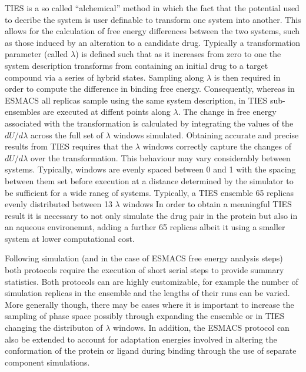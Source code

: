 TIES is a so called ``alchemical'' method in which the fact that the potential used to decribe the system is user definable to transform one 
system into another.
This allows for the calculation of free energy differences between the two 
systems, such as those induced by an alteration to a candidate drug.
Typically a transformation parameter (called $\lambda$) is defined such that as it increases from zero to one the system description transforms from containing an 
initial drug to a target compound via a series of hybrid states.
Sampling along $\lambda$ is then required in order to compute the difference in binding free energy.
Consequently, whereas in ESMACS all replicas sample using the same system description, 
in TIES sub-ensembles are executed at diffent points along $\lambda$.
The change in free energy associated with the transformation is calculated by integrating the 
values of the $dU/d\lambda$ across the full set of $\lambda$ windows simulated.
Obtaining accurate and precise results from TIES requires that the $\lambda$ windows correctly 
capture the changes of $dU/d\lambda$ over the transformation.
This behaviour may vary considerably between systems.
Typically, windows are evenly spaced between 0 and 1 with the spacing between them set before 
execution at a distance determined by the simulator to be sufficient for a wide raneg of systems. 
Typically, a TIES ensemble 65 replicas evenly distributed between 13 $\lambda$ windows
In order to obtain a meaningful TIES result it is necessary to not only simulate the drug pair 
in the protein but also in an aqueous environemnt, adding a further 65 replicas albeit it using a
smaller system at lower computational cost.

Following simulation (and in the case of ESMACS free energy analysis steps) both protocols require
the execution of short serial steps to provide summary statistics.
Both protocols can are highly customizable, for example the number of simulation replicas in the 
ensemble and the lengths of their runs can be varied.
More generally though, there may be cases where it is important to increase the sampling of phase 
space possibly through expanding the ensemble or in TIES changing the distributon of $\lambda$ 
windows.
In addition, the ESMACS protocol can also be extended to account for adaptation energies involved 
in altering the conformation of the protein or ligand during binding through the use of separate 
component simulations.



